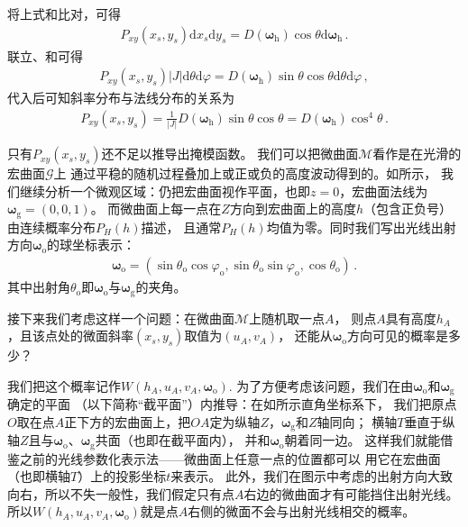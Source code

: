 将上式和比对，可得
\begin{align}\label{eq:08-ex01-P2D}
    P_{xy}(x_s,y_s)\mathrm{d}x_s\mathrm{d}y_s=
    D({\bm\omega}_{\mathrm{h}})\cos\theta\mathrm{d}{\bm\omega}_{\mathrm{h}}\, .
\end{align}
联立、和可得
\begin{align}
    P_{xy}(x_s,y_s)|J|\mathrm{d}\theta\mathrm{d}\varphi
    =D({\bm\omega}_{\mathrm{h}})\sin\theta\cos\theta\mathrm{d}\theta\mathrm{d}\varphi\, ,
\end{align}
代入后可知斜率分布与法线分布的关系为
\begin{align}\label{eq:08-ex01-relation-P2D-McrofacetDistribution}
    P_{xy}(x_s,y_s)=\frac{1}{|J|}D({\bm\omega}_{\mathrm{h}})\sin\theta\cos\theta
    =D({\bm\omega}_{\mathrm{h}})\cos^4\theta\, .
\end{align}

只有$P_{xy}(x_s,y_s)$还不足以推导出掩模函数。
我们可以把微曲面$\mathcal{M}$看作是在光滑的宏曲面$\mathcal{G}$上
通过平稳的随机过程叠加上或正或负的高度波动得到的。如所示，
我们继续分析一个微观区域：仍把宏曲面视作平面，也即$z=0$，宏曲面法线为${\bm\omega}_{\mathrm{g}}=(0,0,1)$。
而微曲面上每一点在$Z$方向到宏曲面上的高度$h$（包含正负号）由连续概率分布$P_H(h)$描述，
且通常$P_H(h)$均值为零。同时我们写出光线出射方向${\bm\omega}_{\mathrm{o}}$的球坐标表示：
\begin{align}
    {\bm\omega}_{\mathrm{o}}=(\sin\theta_{\mathrm{o}}\cos\varphi_{\mathrm{o}},\sin\theta_{\mathrm{o}}\sin\varphi_{\mathrm{o}},\cos\theta_{\mathrm{o}})\, .
\end{align}
其中出射角$\theta_{\mathrm{o}}$即${\bm\omega}_{\mathrm{o}}$与${\bm\omega}_{\mathrm{g}}$的夹角。

接下来我们考虑这样一个问题：在微曲面$\mathcal{M}$上随机取一点$A$，
则点$A$具有高度$h_A$，且该点处的微面斜率$(x_s,y_s)$取值为$(u_A,v_A)$，
还能从${\bm\omega}_{\mathrm{o}}$方向可见的概率是多少？

我们把这个概率记作$W(h_A,u_A,v_A,{\bm\omega}_{\mathrm{o}})$.
为了方便考虑该问题，我们在由${\bm\omega}_{\mathrm{o}}$和${\bm\omega}_{\mathrm{g}}$确定的平面
（以下简称“截平面”）内推导：在如所示直角坐标系下，
我们把原点$O$取在点$A$正下方的宏曲面上，把$OA$定为纵轴$Z$，${\bm\omega}_{\mathrm{g}}$和$Z$轴同向；
横轴$T$垂直于纵轴$Z$且与${\bm\omega}_{\mathrm{o}}$、${\bm\omega}_{\mathrm{g}}$共面（也即在截平面内），
并和${\bm\omega}_{\mathrm{o}}$朝着同一边。
这样我们就能借鉴之前的光线参数化表示法——微曲面上任意一点的位置都可以
用它在宏曲面（也即横轴$T$）上的投影坐标$t$来表示。
此外，我们在图示中考虑的出射方向大致向右，所以不失一般性，我们假定只有点$A$右边的微曲面才有可能挡住出射光线。
所以$W(h_A,u_A,v_A,{\bm\omega}_{\mathrm{o}})$就是点$A$右侧的微面不会与出射光线相交的概率。

